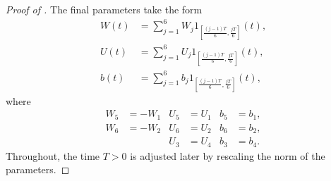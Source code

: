 \documentclass[a4paper,11pt]{article}
\theoremstyle{plain}
\newcommand{\bW}{\bm{\mathit{W}}}
\newcommand{\bU}{\bm{\mathit{U}}}
\numberwithin{equation}{section}
\begin{document}
\begin{proof}[Proof of ]
The final parameters take the form
\begin{align*}
    \bW(t) &= \sum_{j=1}^6 \bW_j 1_{\left[\frac{(j-1)T}{6},\frac{jT}{6}\right]}(t),\\
    \bU(t) &= \sum_{j=1}^6 \bU_j 1_{\left[\frac{(j-1)T}{6},\frac{jT}{6}\right]}(t),\\
    b(t) &= \sum_{j=1}^6 b_j 1_{\left[\frac{(j-1)T}{6},\frac{jT}{6}\right]}(t),
\end{align*}
where 
\begin{align*}
  \bW_5 &= -\bW_1 & \bU_5 &= \bU_1 & b_5 &= b_1, \\
  \bW_6 &= -\bW_2 & \bU_6 &= \bU_2 & b_6 &= b_2, \\
         &         & \bU_3 &= \bU_4 & b_3 &= b_4.
\end{align*}
Throughout, the time \( T > 0 \) is adjusted later by rescaling the norm of the parameters.




\end{proof}
\end{document}
